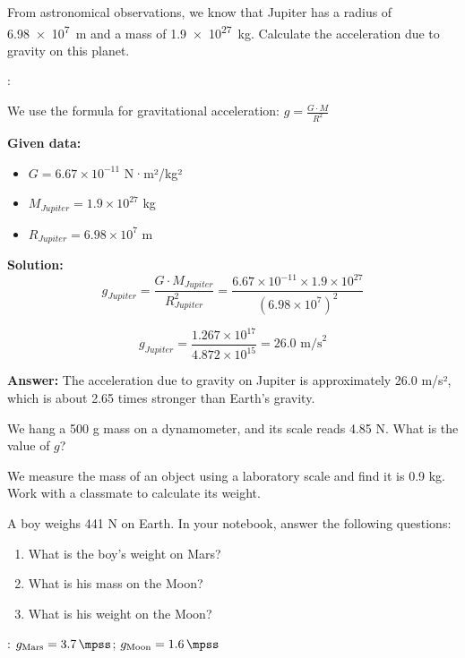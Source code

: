 \begin{exercise}
    From astronomical observations, we know that Jupiter has a radius of \qty{6.98e7}{\metre} and a mass of \qty{1.9e27}{\kilo\g}.
    Calculate the acceleration due to gravity on this planet.

    \datos{}: \Ggravitacion

    \begin{solu}
        We use the formula for gravitational acceleration: $g = \frac{G \cdot M}{R^2}$

        \textbf{Given data:}
        \begin{itemize}
            \item $G = 6.67 \times 10^{-11}$ N·m²/kg²
            \item $M_{Jupiter} = 1.9 \times 10^{27}$ kg
            \item $R_{Jupiter} = 6.98 \times 10^{7}$ m
        \end{itemize}

        \textbf{Solution:}
        $$g_{Jupiter} = \frac{G \cdot M_{Jupiter}}{R_{Jupiter}^2} = \frac{6.67 \times 10^{-11} \times 1.9 \times 10^{27}}{(6.98 \times 10^7)^2}$$

        $$g_{Jupiter} = \frac{1.267 \times 10^{17}}{4.872 \times 10^{15}} = 26.0\text{ m/s}^2$$

        \textbf{Answer:} The acceleration due to gravity on Jupiter is approximately 26.0 m/s², which is about 2.65 times stronger than Earth's gravity.
    \end{solu}
\end{exercise}



\begin{exercise}
    We hang a 500 g mass on a dynamometer, and its scale reads 4.85 N. What is the value of \( g \)?
\end{exercise}

\begin{exercise}
    We measure the mass of an object using a laboratory scale and find it is 0.9 kg.
    Work with a classmate to calculate its weight.
\end{exercise}


\begin{exercise}
    A boy weighs 441 N on Earth.
    In your notebook, answer the following questions:
    \begin{enumerate}[label=\alph*)]
\item What is the boy’s weight on Mars?
\item What is his mass on the Moon?
\item What is his weight on the Moon?
    \end{enumerate}

    \datos{}: \( g_{\text{Mars}} = \qty{3.7}{\mpss} \); \( g_{\text{Moon}} = \qty{1.6}{\mpss} \)
\end{exercise}


